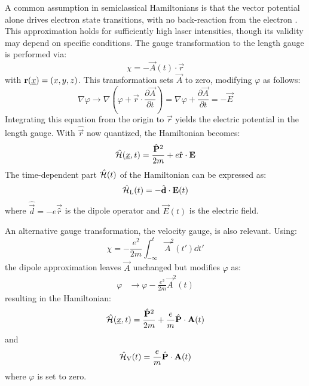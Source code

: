 A common assumption in semiclassical Hamiltonians is that the vector potential alone drives electron state transitions, with no back-reaction from the electron \cite{bosmandipoleapprox}. 
This approximation holds for sufficiently high laser intensities, though its validity may depend on specific conditions. %
The gauge transformation to the length gauge is performed via:
\begin{equation}
    \chi = -\vec{A}(t)\cdot \vec{r}
\end{equation}
with $\mathbf{r}(\underline{x})=(x,y,z)$.
This transformation sets $\vec{A}$ to zero, modifying $\varphi$ as follows:%
\begin{equation}
    \nabla \varphi \to \nabla (\varphi + \vec{r} \cdot \frac{\partial \vec{A}}{\partial t}) = \nabla \varphi + \frac{\partial \vec{A}}{\partial t} = - \vec{E}
\end{equation}
Integrating this equation from the origin to $\vec{r}$ yields the electric potential in the length gauge. %
With $\hat{\vec{r}}$ now quantized, the Hamiltonian becomes:
\begin{equation*}%
    \hat{\Hs}(\uvec{x}, t) = \frac{\hat{\vec{P}}^2}{2m} + e \hat{\vec{r}} \cdot \vec{E}%
\end{equation*}
The time-dependent part $\hat{\mathcal{H}}(t)$ of the Hamiltonian can be expressed as:
\begin{equation}
    \hat{\mathcal{H}}_{\mathrm{L}}(t) = -\hat{\mathbf{d}} \cdot \mathbf{E}(t) \label{eq:dipoleApprox}
\end{equation}
where $\hat{\vec{d}}=-e\vec{\hat{r}}$ is the dipole operator and $\vec{E}(t)$ is the electric field.

\medskip
An alternative gauge transformation, the velocity gauge, is also relevant. 
Using:
\begin{equation*}
    \chi = -\frac{e^2}{2m}\int_{-\infty}^{t} \vec{A}^2(t') \dd t'
\end{equation*}
the dipole approximation leaves $\vec{A}$ unchanged but modifies $\varphi$ as:
\begin{align*}
    \varphi &\to \varphi -\frac{e^2}{2m}\vec{A}^2(t)
\end{align*}
resulting in the Hamiltonian:
\begin{equation*}
    \hat{\mathcal{H}}(\underline{x}, t) = \frac{\hat{\mathbf{P}}^2}{2m} +\frac{e}{m}\hat{\mathbf{P}} \cdot \mathbf{A}(t)
\end{equation*}
and
\begin{equation}
    \hat{\mathcal{H}}_{\mathrm{V}}(t) = \frac{e}{m}\hat{\mathbf{P}} \cdot \mathbf{A}(t) \label{eq:dipoleApprox_velocity}
\end{equation}
where $\varphi$ is set to zero.

